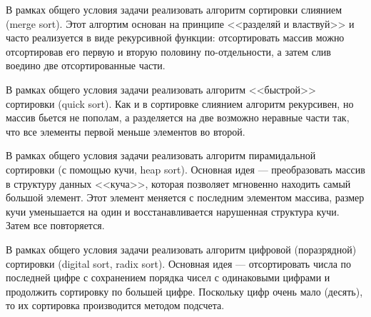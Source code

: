 \begin{zztask}
В рамках общего условия задачи реализовать алгоритм 
сортировки слиянием (merge sort). Этот алгортим основан на принципе
<<разделяй и властвуй>> и часто реализуется в виде рекурсивной функции:
отсортировать массив можно отсортировав его первую и вторую половину 
по-отдельности, а затем слив воедино две отсортированные части.
\end{zztask}

\begin{zztask}
В рамках общего условия задачи реализовать алгоритм 
<<быстрой>> сортировки (quick sort). Как и в сортировке слиянием алгоритм
рекурсивен, но массив бьется не пополам, а разделяется на две возможно 
неравные части так, что все элементы первой меньше элементов во второй.
\end{zztask}

\begin{zztask}
В рамках общего условия задачи реализовать алгоритм 
пирамидальной сортировки (с помощью кучи, heap sort). Основная идея ---
преобразовать массив в структуру данных <<куча>>, которая позволяет мгновенно 
находить самый большой элемент. Этот элемент меняется с последним элементом 
массива, размер кучи уменьшается на один и восстанавливается нарушенная 
структура кучи. Затем все повторяется.
\end{zztask}

\begin{zztask}
В рамках общего условия задачи реализовать алгоритм 
цифровой (поразрядной) сортировки (digital sort, radix sort). Основная идея ---
отсортировать числа по последней цифре с сохранением порядка чисел с одинаковыми 
цифрами и продолжить сортировку по большей цифре. Поскольку цифр очень мало (десять), 
то их сортировка производится методом подсчета.
\end{zztask}
